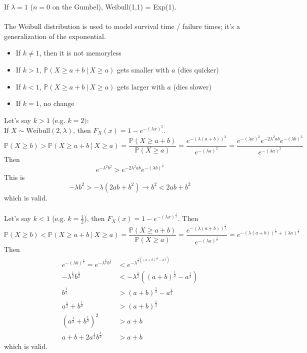 \documentclass[12pt]{article}
\newcommand{\prob}[1]{\mathbb{P}(#1)}
\newcommand{\cprob}[2]{\mathbb{P}(#1 ~|~ #2)}
\begin{document}
If $\lambda = 1$ ($n = 0$ on the Gumbel), Weibull(1,1) = Exp(1). \\~\\
The Weibull distribution is used to model survival time / failure times; it's a generalization of the exponential.  \begin{itemize} 
\item If $ k \neq 1$, then it is not memoryless
\item If $k > 1$, $\cprob{X \geq a + b}{X \geq a}$ gets smaller with $a$ (dies quicker) 
\item If $k < 1$, $\cprob{X \geq a + b}{X \geq a}$ gets larger with $a$ (dies slower) 
\item If $k = 1$, no change \end{itemize} 
Let's say $k > 1$ (e.g. $k = 2)$: \\
If $X \sim \text{Weibull}(2,\lambda)$, then $F_X(x) = 1 - e^{-(\lambda x)^2}$. 
$$\prob{X \geq b} > \cprob{X \geq a + b}{X \geq a} = \frac{\prob{X \geq a + b}}{\prob{X \geq a}} = \frac{e^{-(\lambda(a + b))^2}}{e^{-(\lambda a)^2}} = \frac{e^{-(\lambda a)^2} e^{-2\lambda^2 ab} e^{-(\lambda b)^2}}{e^{-(\lambda a)^2}} $$ Then 
$$e^{-\lambda^2 b^2} > e^{-2\lambda^2 ab}e^{-(\lambda b)^2}$$ This is $$-\lambda b^2 > -\lambda(2ab + b^2) \to b^2 < 2ab + b^2 $$ which is valid. \\~\\
Let's say $ k < 1$ (e.g. $k = \frac{1}{2}$), then $F_X(x) = 1 - e^{-(\lambda x)^{\frac{1}{2}}}$. Then 
$$\prob{X \geq b} < \cprob{X \geq a + b}{X \geq a} = \frac{\prob{X \geq a + b}}{\prob{X \geq a}} = \frac{e^{-(\lambda(a + b))^{\frac{1}{2}}}}{e^{-(\lambda a)^{\frac{1}{2}}}} = e^{-(\lambda(a + b))^{\frac{1}{2}} + (\lambda a)^{\frac{1}{2}}} $$ Then $$ \begin{aligned} e^{-(\lambda b)^{\frac{1}{2}}} = e^{-\lambda^{\frac{1}{2}} b^{\frac{1}{2}}} &< e^{-\lambda^{\frac{1}{2}((a + b)^{\frac{1}{2}} - a^{\frac{1}{2}})}} \\ -\lambda^{\frac{1}{2}}b^{\frac{1}{2}} &< -\lambda^{\frac{1}{2}}((a + b)^{\frac{1}{2}} - a^{\frac{1}{2}}) \\ b^{\frac{1}{2}} &> (a + b)^{\frac{1}{2}} - a^{\frac{1}{2}} \\ a^{\frac{1}{2}} + b^{\frac{1}{2}} &> (a + b)^{\frac{1}{2}} \\ (a^{\frac{1}{2}} + b^{\frac{1}{2}})^2 &> a + b \\ a + b + 2a^{\frac{1}{2}}b^{\frac{1}{2}} &> a + b \end{aligned} $$ which is valid. \\~\\
\end{document}
